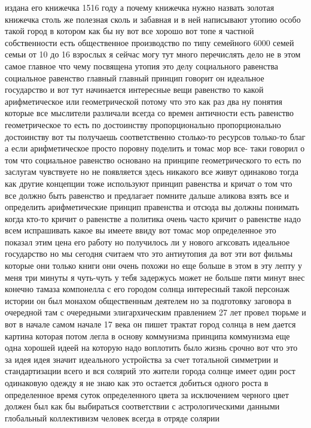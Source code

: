 издана его книжечка 1516 году а почему книжечка нужно назвать золотая книжечка
столь же полезная сколь и забавная и в ней написывают утопию особо такой город в
котором как бы ну вот все хорошо вот топе я частной собственности есть
общественное производство по типу семейного 6000 семей семьи от 10 до 16
взрослых я сейчас могу тут много перечислять дело не в этом самое главное что
чему посвящена утопия это делу социального равенства социальное равенство
главный главный принцип говорит он идеальное государство и вот тут начинается
интересные вещи равенство то какой арифметическое или геометрической потому что
это как раз два ну понятия которые все мыслители различали всегда со времен
античности есть равенство геометрическое то есть по достоинству пропорционально
пропорционально достоинству вот ты получаешь соответственно столько-то ресурсов
только-то благ а если арифметическое просто поровну поделить и томас мор все-
таки говорил о том что социальное равенство основано на принципе геометрического
то есть по заслугам чувствуете но не появляется здесь никакого все живут
одинаково тогда как другие концепции тоже используют принцип равенства и кричат
о том что все должно быть равенство и предлагает помните дальше аликова взять
все и определить арифметические принцип правенства и отсюда вы должны понимать
когда кто-то кричит о равенстве а политика очень часто кричит о равенстве надо
всем испрашивать какое вы имеете ввиду вот томас мор определенное это показал
этим цена его работу но получилось ли у нового агксовать идеальное государство
но мы сегодня считаем что это антиутопия да вот эти вот фильмы которые они
только книги они очень похожи но еще больше в этом в эту лепту у меня три минуты
я чуть-чуть у тебя задержусь может не больше пяти минут внес конечно тамаза
компонелла с его городом солнца интересный такой персонаж истории он был монахом
общественным деятелем но за подготовку заговора в очередной там с очередными
элигархическим правлением 27 лет провел тюрьме и вот в начале самом начале 17
века он пишет трактат город солнца в нем дается картина которая потом легла в
основу коммунизма принципа коммунизма еще одна хорошей идеей на которую надо
воплотить было жизнь срочно вот что это за идея идея значит идеального
устройства за счет тотальной симметрии и стандартизации всего и вся солярий это
жители города солнце имеет один рост одинаковую одежду я не знаю как это
остается добиться одного роста в определенное время суток определенного цвета за
исключением черного цвет должен был как бы выбираться соответствии с
астрологическими данными глобальный коллективизм человек всегда в отряде солярии
